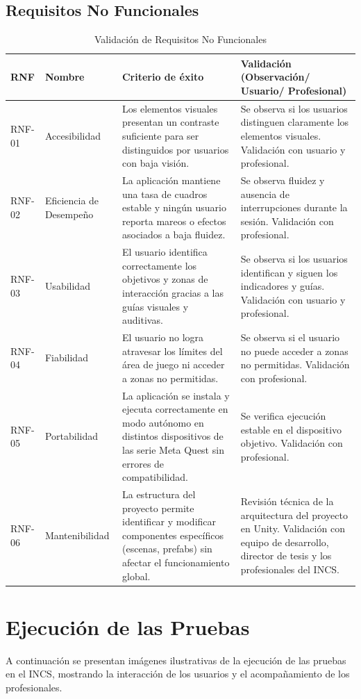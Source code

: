 \subsection{Requisitos No Funcionales}
\begin{table}[H]
\centering
\small
\caption{Validación de Requisitos No Funcionales}
\begin{tabular}{|l|p{3cm}|p{5.2cm}|p{5.2cm}|}
\hline
\textbf{RNF} & \textbf{Nombre} & \textbf{Criterio de éxito} & \textbf{Validación (Observación/ Usuario/ Profesional)} \\
\hline
RNF-01 & Accesibilidad & Los elementos visuales presentan un contraste suficiente para ser distinguidos por usuarios con baja visión. & Se observa si los usuarios distinguen claramente los elementos visuales. Validación con usuario y profesional. \\
\hline
RNF-02 & Eficiencia de Desempeño & La aplicación mantiene una tasa de cuadros estable y ningún usuario reporta mareos o efectos asociados a baja fluidez. & Se observa fluidez y ausencia de interrupciones durante la sesión. Validación con profesional. \\
\hline
RNF-03 & Usabilidad & El usuario identifica correctamente los objetivos y zonas de interacción gracias a las guías visuales y auditivas. & Se observa si los usuarios identifican y siguen los indicadores y guías. Validación con usuario y profesional. \\
\hline
RNF-04 & Fiabilidad & El usuario no logra atravesar los límites del área de juego ni acceder a zonas no permitidas. & Se observa si el usuario no puede acceder a zonas no permitidas. Validación con profesional. \\
\hline
RNF-05 & Portabilidad & La aplicación se instala y ejecuta correctamente en modo autónomo en distintos dispositivos de las serie Meta Quest sin errores de compatibilidad. & Se verifica ejecución estable en el dispositivo objetivo. Validación con profesional. \\
\hline
RNF-06 & Mantenibilidad & La estructura del proyecto permite identificar y modificar componentes específicos (escenas, prefabs) sin afectar el funcionamiento global. & Revisión técnica de la arquitectura del proyecto en Unity. Validación con equipo de desarrollo, director de tesis y los profesionales del INCS. \\
\hline
\end{tabular}
\end{table}

\section{Ejecución de las Pruebas}
A continuación se presentan imágenes ilustrativas de la ejecución de las pruebas en el INCS, mostrando la interacción de los usuarios y el acompañamiento de los profesionales.

